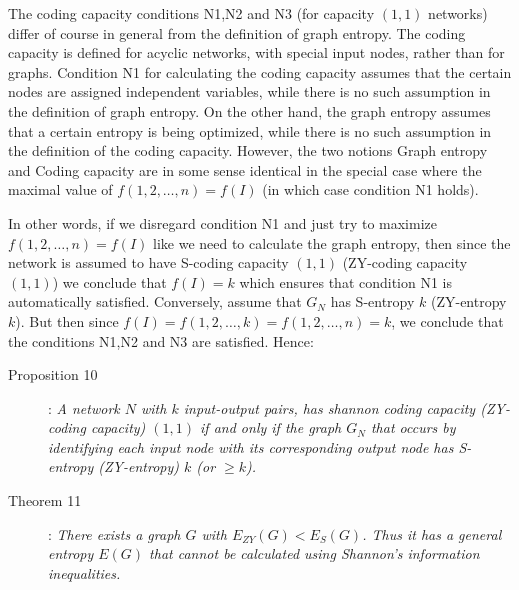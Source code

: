 \documentclass[12pt]{article}
\begin{document}
\bigskip

The coding capacity conditions N1,N2 and N3 (for capacity $(1,1)$  networks) differ of course in general from the definition of graph entropy. The coding capacity is defined for acyclic networks, with special input nodes, rather than for graphs. Condition N1 for calculating the coding capacity assumes that the certain nodes are assigned independent variables, while there is no such assumption in the definition of graph entropy. On the other hand, the graph entropy assumes that a certain entropy is being optimized, while there is no such assumption in the definition of the coding capacity. However, the two notions Graph entropy and Coding capacity are in some sense identical in the special case where the maximal value of $f(1,2,\ldots,n)=f(I)$ (in which case condition N1 holds).

In other words, if we disregard condition N1 and just try to maximize $f(1,2,\ldots,n)=f(I)$ like we need to calculate the graph entropy, then since the network is assumed to have S-coding capacity $(1,1)$ (ZY-coding capacity $(1,1)$) 
we conclude that $f(I) =k$ which ensures that condition N1 is automatically satisfied.  Conversely, assume that $G_N$ has S-entropy $k$ (ZY-entropy $k$). But then since 
$f(I)=f(1,2,\ldots,k)=f(1,2,\ldots, n)=k$, we conclude that the conditions N1,N2 and N3 are satisfied. Hence:

\begin{description}

\item[Proposition 10]:  
{\it A network $N$ with $k$ input-output pairs, has shannon 
coding capacity (ZY-coding capacity) 
$(1,1)$ if and only if
 the graph $G_N$ that occurs by identifying each input node with its corresponding output node
 has S-entropy (ZY-entropy) $k$ (or $\geq k$).}
\end{description}

 \begin{description}
 \item [Theorem 11]:
 \it
\noindent
There exists a graph $G$ with $E_{ZY}(G) < E_S(G)$. Thus it has a general entropy $E(G)$ that cannot be calculated using Shannon's information inequalities.  
\rm
  \end{description}
 
\end{document}
